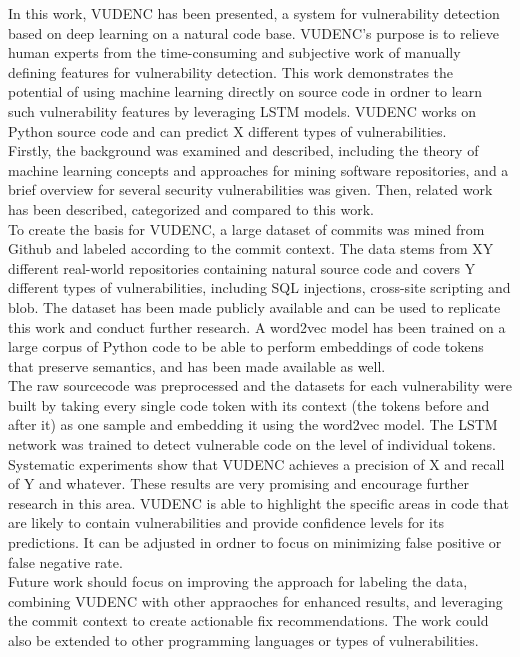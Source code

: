 \documentclass[
a4paper,
pagesize,
pdftex,
12pt,
twoside, %
BCOR=5mm, %
ngerman,
fleqn,
final,
]{scrartcl}
\begin{document}
	In this work, VUDENC has been presented, a system for vulnerability detection based on deep learning on a natural code base. VUDENC's purpose is to relieve human experts from the time-consuming and subjective work of manually defining features for vulnerability detection. This work demonstrates the potential of using machine learning directly on source code in ordner to learn such vulnerability features by leveraging LSTM models. VUDENC works on Python source code and can predict X different types of vulnerabilities.\\
	Firstly, the background was examined and described, including the theory of machine learning concepts and approaches for mining software repositories, and a brief overview for several security vulnerabilities was given. Then, related work has been described, categorized and compared to this work.\\
	To create the basis for VUDENC, a large dataset of commits was mined from Github and labeled according to the commit context. The data stems from XY different real-world repositories containing natural source code and covers Y different types of vulnerabilities, including SQL injections, cross-site scripting and blob. The dataset has been made publicly available and can be used to replicate this work and conduct further research. A word2vec model has been trained on a large corpus of Python code to be able to perform embeddings of code tokens that preserve semantics, and has been made available as well.\\
	The raw sourcecode was preprocessed and the datasets for each vulnerability were built by taking every single code token with its context (the tokens before and after it) as one sample and embedding it using the word2vec model. The LSTM network was trained to detect vulnerable code on the level of individual tokens.\\
	Systematic experiments show that VUDENC achieves a precision of X and recall of Y and whatever.  These results are very promising and encourage further research in this area. VUDENC is able to highlight the specific areas in code that are likely to contain vulnerabilities and provide confidence levels for its predictions. It can be adjusted in ordner to focus on minimizing false positive or false negative rate. \\
	Future work should focus on improving the approach for labeling the data, combining VUDENC with other appraoches for enhanced results, and leveraging the commit context to create actionable fix recommendations. The work could also be extended to other programming languages or types of vulnerabilities.
	
\end{document}
